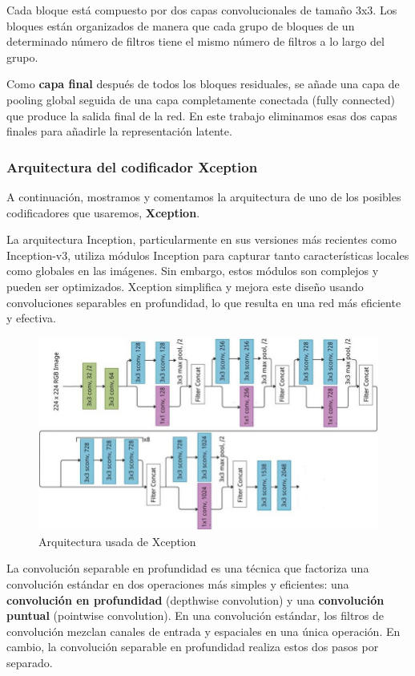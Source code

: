 Cada bloque está compuesto por dos capas convolucionales de tamaño 3x3. Los bloques están organizados de manera que cada grupo de bloques de un determinado número de filtros tiene el mismo número de filtros a lo largo del grupo.

Como \textbf{capa final} después de todos los bloques residuales, se añade una capa de pooling global seguida de una capa completamente conectada (fully connected) que produce la salida final de la red. En este trabajo eliminamos esas dos capas finales para añadirle la representación latente.

\subsubsection{Arquitectura del codificador Xception}

A continuación, mostramos y comentamos la arquitectura de uno de los posibles codificadores que usaremos, \textbf{Xception}.

La arquitectura Inception, particularmente en sus versiones más recientes como Inception-v3, utiliza módulos Inception para capturar tanto características locales como globales en las imágenes. Sin embargo, estos módulos son complejos y pueden ser optimizados. Xception simplifica y mejora este diseño usando convoluciones separables en profundidad, lo que resulta en una red más eficiente y efectiva.

\begin{figure}[H]
	\centering
	\includegraphics[width=0.8\linewidth]{imagenes/xception_arch.png}
	\caption{Arquitectura usada de Xception \cite{srinivasan2021performance}}
\end{figure}

La convolución separable en profundidad es una técnica que factoriza una convolución estándar en dos operaciones más simples y eficientes: una \textbf{convolución en profundidad} (depthwise convolution) y una \textbf{convolución puntual} (pointwise convolution). En una convolución estándar, los filtros de convolución mezclan canales de entrada y espaciales en una única operación. En cambio, la convolución separable en profundidad realiza estos dos pasos por separado.

